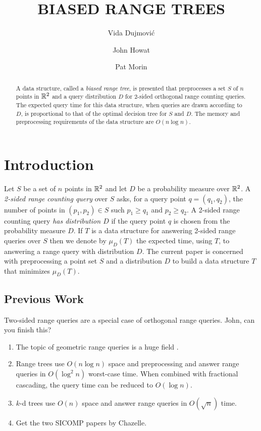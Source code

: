 \documentclass[lotsofwhite,charterfonts]{patmorin}
\title{\MakeUppercase{Biased Range Trees}}
\author{Vida Dujmovi\'c
	\and John Howat
	\and Pat Morin}
\begin{document}
\maketitle
\begin{abstract}
A data structure, called a \emph{biased range tree}, is presented that
preprocesses a set $S$ of $n$ points in $\mathbb{R}^2$ and a query
distribution $D$ for 2-sided orthogonal range counting queries.  The
expected query time for this data structure, when queries are drawn
according to $D$, is proportional to that of the optimal decision tree
for $S$ and $D$.   The memory and preprocessing requirements of the
data structure are $O(n\log n)$.
\end{abstract}

\section{Introduction}

Let $S$ be a set of $n$ points in $\mathbb{R}^2$ and let $D$ be a probability
measure over $\mathbb{R}^2$.  A \emph{2-sided range counting query} over $S$
asks, for a query point $q=(q_1,q_2)$, the number of points in
$(p_1,p_2)\in S$ such $p_1 \ge q_1$ and $p_2 \ge q_2$.  A 2-sided
range counting query \emph{has distribution $D$} if the query point
$q$ is chosen from the probability measure $D$.  If $T$ is a data
structure for answering 2-sided range queries over $S$ then we denote
by $\mu_D(T)$ the expected time, using $T$, to answering a range query
with distribution $D$.  The current paper is concerned with
preprocessing a point set $S$ and a distribution $D$ to build a data
structure $T$ that minimizes $\mu_D(T)$.

\subsection{Previous Work}

Two-sided range queries are a special case of orthogonal range
queries.  John, can you finish this?

\begin{enumerate}
\item The topic of geometric range queries is a huge field
\cite{agarwal_erickson}.

\item Range trees \cite{bentley} use $O(n\log n)$ space and
preprocessing and answer range queries in $O(\log^2 n)$
worst-case time.  When combined with fractional cascading, the query
time can be reduced to $O(\log n)$.

\item $k$-d trees use $O(n)$ space and answer range queries in
$O(\sqrt{n})$ time.

\item Get the two SICOMP papers by Chazelle.
\end{enumerate}
\end{document}

